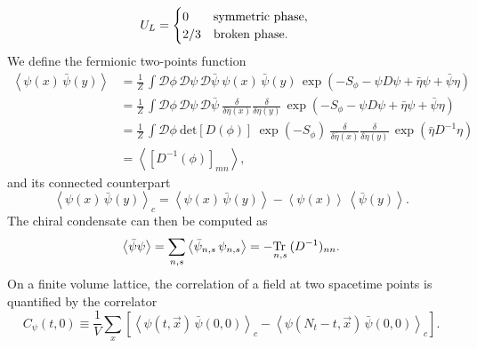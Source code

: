 \begin{equation*}
    U_L = \begin{cases}0 \quad \hphantom{/3} \text{symmetric phase}, \\ 2/3 \quad \text{broken phase}. \end{cases}
\end{equation*}
We define the fermionic two-points function
\begin{equation} 
\begin{aligned}
    \left\langle \psi(x) \, \bar\psi(y) \right\rangle 
    &= \frac{1}{Z} \, \int \mathcal{D}\phi \, \mathcal{D}\psi \, \mathcal{D}\bar\psi \ \psi(x) \, \bar\psi(y) \, \exp \left( - S_\phi - \psi D \psi + \bar\eta \psi + \bar \psi \eta \right) \\
    &= \frac{1}{Z} \, \int \mathcal{D}\phi \, \mathcal{D}\psi \, \mathcal{D}\bar\psi \ \frac{\delta}{\delta \bar \eta(x)} \frac{\delta}{\delta \eta(y)} \, \exp \left( - S_\phi - \psi D \psi + \bar\eta \psi + \bar \psi \eta \right) \\
    &= \frac{1}{Z} \, \int \mathcal{D}\phi \ \text{det}\left[D(\phi)\right] \ \exp \left( - S_\phi \right) \ \frac{\delta}{\delta \bar \eta(x)} \frac{\delta}{\delta \eta(y)} \, \exp\left( \bar\eta D^{-1} \eta \right) \\
    &= \left\langle \left[D^{-1}(\phi)\right]_{mn}\right\rangle,
\end{aligned}
\label{eq:D_inv_condensate}
\end{equation}
and its connected counterpart
\begin{equation*}
    \left\langle \psi(x) \, \bar\psi(y) \right\rangle_c = \left\langle \psi(x) \, \bar\psi(y) \right\rangle  - \left\langle \psi(x) \right\rangle \, \left\langle\bar\psi(y) \right\rangle .
\end{equation*}
The chiral condensate can then be computed as
\begin{equation*}
    \left\langle  \bar\psi \psi \right\rangle = \underset{n,s}\sum  \left\langle \bar\psi_{n,s} \, \psi_{n,s} \right\rangle = -\underset{n,s}{\operatorname{\text{Tr} \,}} \, (D^{-1})_{nn}.
\end{equation*}
On a finite volume lattice, the correlation of a field at two spacetime points is quantified by the correlator
\begin{equation}
    C_\psi(t,0) \equiv \frac{1}{V} \sum_{x} \left[\left\langle \psi(t, \vec{x}) \, \bar\psi(0,0)\right\rangle_c - \left\langle \psi(N_t-t, \vec{x}) \, \bar\psi(0,0)\right\rangle_c \right] .
    \label{eq:correlator_definition}
\end{equation}
